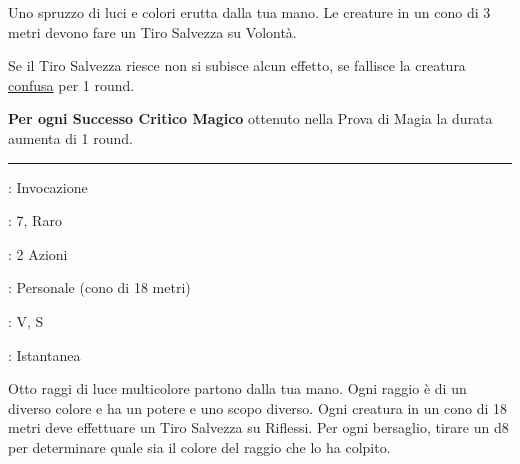 \begin{multicols}{2}
Uno spruzzo di luci e colori erutta dalla tua mano. Le creature in un cono di 3 metri devono fare un Tiro Salvezza su Volontà.

Se il Tiro Salvezza riesce non si subisce alcun effetto, se fallisce la creatura \hyperlink{confusionecondizione}{confusa} per 1 round.

\textbf{Per ogni Successo Critico Magico} ottenuto nella Prova di Magia la durata aumenta di 1 round.

\smallskip\noindent\rule{\linewidth}{2pt} \hypertarget{Spruzzo Prismatico}{}\smallskip{}
\noindent
\begin{description}[noitemsep, topsep=0pt, parsep=0pt, partopsep=0pt, leftmargin=0cm, labelwidth=2.8cm]
	\item[\textbf{Lista di Magia}]: Invocazione
	\item[\textbf{Livello}]: 7, Raro
	\item[\textbf{T. di Lancio}]: 2 Azioni
	\item[\textbf{Gittata}]: Personale (cono di 18 metri)
	\item[\textbf{Componenti}]: V, S
	\item[\textbf{Durata}]: Istantanea
\end{description}

Otto raggi di luce multicolore partono dalla tua mano. Ogni raggio è di un diverso colore e ha un potere e uno scopo diverso. Ogni creatura in un cono di 18 metri deve effettuare un Tiro Salvezza su Riflessi. Per ogni bersaglio, tirare un d8 per determinare quale sia il colore del raggio che lo ha colpito.


\end{multicols}
